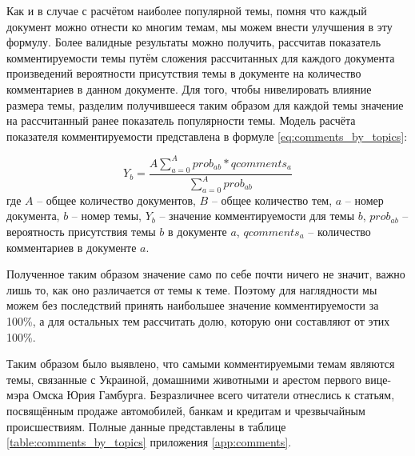 Как и в случае с расчётом наиболее популярной темы, помня что каждый документ можно отнести ко многим темам, мы можем внести улучшения в эту формулу. Более валидные результаты можно получить, рассчитав показатель комментируемости темы путём сложения рассчитанных для каждого документа произведений вероятности присутствия темы в документе на количество комментариев в данном документе. Для того, чтобы нивелировать влияние размера темы, разделим получившееся таким образом для каждой темы значение на рассчитанный ранее показатель популярности темы. Модель расчёта показателя комментируемости представлена в формуле \ref{eq:comments_by_topics}:

\begin{equation}\label{eq:comments_by_topics}
Y_b = \frac{A \sum \limits_{a=0}^{A}prob_{ab} * qcomments_a}{\sum_{a=0}^{A} prob_{ab}}
\end{equation}
где $A$ -- общее количество документов, $B$ -- общее количество тем, $a$ -- номер документа, $b$ -- номер темы, $Y_b$ -- значение комментируемости для темы $b$, $prob_{ab}$ -- вероятность присутствия темы $b$ в документе $a$, $qcomments_a$ -- количество комментариев в документе $a$.

Полученное таким образом значение само по себе почти ничего не значит, важно лишь то, как оно различается от темы к теме. Поэтому для наглядности мы можем без последствий принять наибольшее значение комментируемости за 100\%, а для остальных тем рассчитать долю, которую они составляют от этих 100\%.

Таким образом было выявлено, что самыми комментируемыми темам являются темы, связанные с Украиной, домашними животными и арестом первого вице-мэра Омска Юрия Гамбурга. Безразличнее всего читатели отнеслись к статьям, посвящённым продаже автомобилей, банкам и кредитам и чрезвычайным происшествиям. Полные данные представлены в таблице \ref{table:comments_by_topics} приложения \ref{app:comments}.


